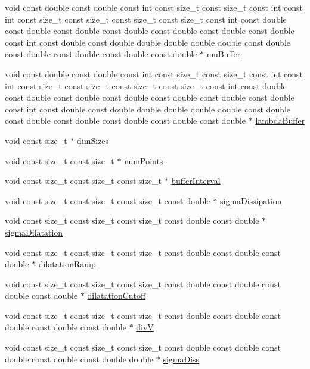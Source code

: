 \begin{DoxyCompactItemize}
\item 
void const double const double const int const size\+\_\+t const size\+\_\+t const int const int const size\+\_\+t const size\+\_\+t const size\+\_\+t const size\+\_\+t const int const double const double const double const double const double const double const double const int const double const double double double double double const double const double const double const double const double $\ast$ \hyperlink{SATKernels_8H_aad34af7cffab47570a25bd8f1427f862}{mu\+Buffer}
\item 
void const double const double const int const size\+\_\+t const size\+\_\+t const int const int const size\+\_\+t const size\+\_\+t const size\+\_\+t const size\+\_\+t const int const double const double const double const double const double const double const double const int const double const double double double double double const double const double const double const double const double const double $\ast$ \hyperlink{SATKernels_8H_ac4082886995a4235f6338205c85d04fe}{lambda\+Buffer}
\item 
void const size\+\_\+t $\ast$ \hyperlink{SATKernels_8H_a338d2e6b5802f9ba652d355df0b1a04b}{dim\+Sizes}
\item 
void const size\+\_\+t const size\+\_\+t $\ast$ \hyperlink{SATKernels_8H_abc84d783b8a1ee234fdf7c43aef803e1}{num\+Points}
\item 
void const size\+\_\+t const size\+\_\+t const size\+\_\+t $\ast$ \hyperlink{SATKernels_8H_a4caa6f5ca62531b8c31e22919f206d68}{buffer\+Interval}
\item 
void const size\+\_\+t const size\+\_\+t const size\+\_\+t const double $\ast$ \hyperlink{SATKernels_8H_a37f2683de24db9314043c0908d11292c}{sigma\+Dissipation}
\item 
void const size\+\_\+t const size\+\_\+t const size\+\_\+t const double const double $\ast$ \hyperlink{SATKernels_8H_a1657cf7729fe0b6d5d9a412ecab80002}{sigma\+Dilatation}
\item 
void const size\+\_\+t const size\+\_\+t const size\+\_\+t const double const double const double $\ast$ \hyperlink{SATKernels_8H_ac59bb34f1cc96772cd2ff3b13a040a57}{dilatation\+Ramp}
\item 
void const size\+\_\+t const size\+\_\+t const size\+\_\+t const double const double const double const double $\ast$ \hyperlink{SATKernels_8H_afe603e2783dc402c56709682a723b77e}{dilatation\+Cutoff}
\item 
void const size\+\_\+t const size\+\_\+t const size\+\_\+t const double const double const double const double const double $\ast$ \hyperlink{SATKernels_8H_a7e17251bb9d4e0676024410ca03462c7}{divV}
\item 
void const size\+\_\+t const size\+\_\+t const size\+\_\+t const double const double const double const double const double double $\ast$ \hyperlink{SATKernels_8H_a4f33b7bbf46dad9ee0eb31f6a0340d7a}{sigma\+Diss}
\end{DoxyCompactItemize}


